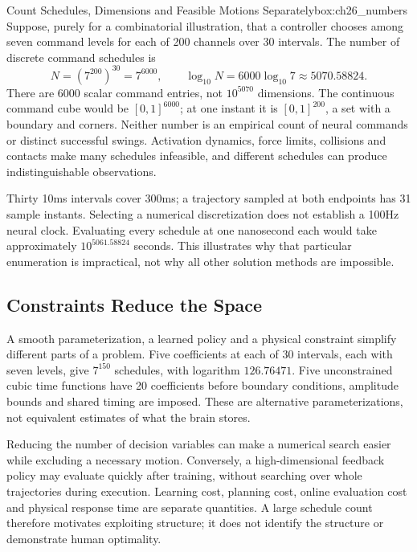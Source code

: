 \begin{principle}{Count Schedules, Dimensions and Feasible Motions Separately}{box:ch26_numbers}
Suppose, purely for a combinatorial illustration, that a controller chooses among seven command levels for each of 200 channels over 30 intervals. The number of discrete command schedules is
\[
N=(7^{200})^{30}=7^{6000},\qquad
\log_{10}N=6000\log_{10}7\approx5070.58824.
\]
There are $6000$ scalar command entries, not $10^{5070}$ dimensions. The continuous command cube would be $[0,1]^{6000}$; at one instant it is $[0,1]^{200}$, a set with a boundary and corners. Neither number is an empirical count of neural commands or distinct successful swings. Activation dynamics, force limits, collisions and contacts make many schedules infeasible, and different schedules can produce indistinguishable observations.

Thirty 10ms intervals cover 300ms; a trajectory sampled at both endpoints has 31 sample instants. Selecting a numerical discretization does not establish a 100Hz neural clock. Evaluating every schedule at one nanosecond each would take approximately $10^{5061.58824}$ seconds. This illustrates why that particular enumeration is impractical, not why all other solution methods are impossible.
\end{principle}

\subsection{Constraints Reduce the Space}
\label{subsec:ch26_constraints}

A smooth parameterization, a learned policy and a physical constraint simplify different parts of a problem. Five coefficients at each of 30 intervals, each with seven levels, give $7^{150}$ schedules, with logarithm $126.76471$. Five unconstrained cubic time functions have 20 coefficients before boundary conditions, amplitude bounds and shared timing are imposed. These are alternative parameterizations, not equivalent estimates of what the brain stores.

Reducing the number of decision variables can make a numerical search easier while excluding a necessary motion. Conversely, a high-dimensional feedback policy may evaluate quickly after training, without searching over whole trajectories during execution. Learning cost, planning cost, online evaluation cost and physical response time are separate quantities. A large schedule count therefore motivates exploiting structure; it does not identify the structure or demonstrate human optimality.

